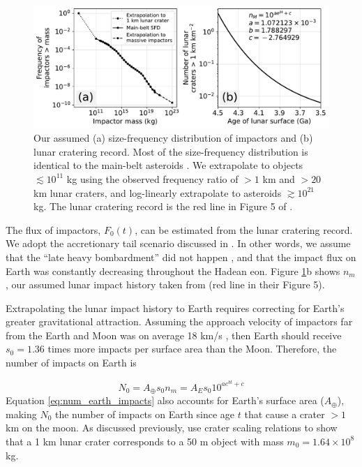 \documentclass[preprint]{aastex63}
\begin{document}
\begin{figure}
  \centering
  \includegraphics[width=1.0\textwidth]{figures/SFD_and_flux.pdf}
  \caption{Our assumed (a) size-frequency distribution of impactors and (b) lunar cratering record. Most of the size-frequency distribution is identical to the main-belt asteroids \citep[Extended Data Figure 1,][]{Marchi_2014}. We extrapolate to objects $\lesssim 10^{11}$ kg using the observed frequency ratio of $> 1$ km and $> 20$ km lunar craters, and log-linearly extrapolate to asteroids $\gtrsim 10^{21}$ kg. The lunar cratering record is the red line in Figure 5 of \citet{Morbidelli_2018}.}
  \label{fig:sfd_and_flux}
\end{figure}

The flux of impactors, $F_0(t)$, can be estimated from the lunar cratering record. We adopt the accretionary tail scenario discussed in \citet{Morbidelli_2018}. In other words, we assume that the ``late heavy bombardment'' did not happen \citep{Cartwright_2022,Hartmann_2019,Zellner_2017}, and that the impact flux on Earth was constantly decreasing throughout the Hadean eon. Figure \ref{fig:sfd_and_flux}b shows $n_m$, our assumed lunar impact history taken from \citet{Morbidelli_2018} (red line in their Figure 5).

Extrapolating the lunar impact history to Earth requires correcting for Earth's greater gravitational attraction. Assuming the approach velocity of impactors far from the Earth and Moon was on average 18 km/s \citep{Morbidelli_2018}, then Earth should receive $s_0 = 1.36$ times more impacts per surface area than the Moon. Therefore, the number of impacts on Earth is

\begin{equation}
  N_0 = A_\oplus s_0 n_m = A_E s_0 10^{a e^{b t} + c}
  \label{eq:num_earth_impacts}
\end{equation}
Equation \eqref{eq:num_earth_impacts} also accounts for Earth's surface area ($A_\oplus$), making $N_0$ the number of impacts on Earth since age $t$ that cause a crater $> 1$ km on the moon. As discussed previously, \citet{Morbidelli_2018} use crater scaling relations to show that a 1 km lunar crater corresponds to a 50 m object with mass $m_0 = 1.64 \times 10^8$ kg.
\end{document}
